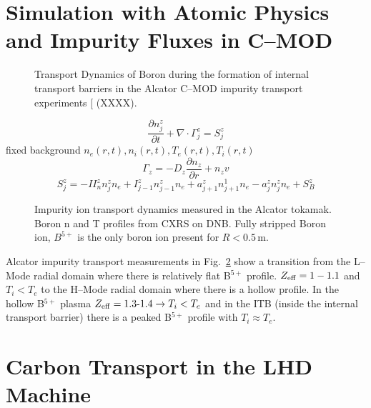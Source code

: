\documentclass[a4paper,openany,12pt]{book}
\begin{document}
\section{Simulation with Atomic Physics and Impurity Fluxes in C--MOD}
%
\begin{figure}[H]
\centerline{}
\caption{Transport Dynamics of Boron during the formation of internal transport barriers in the Alcator C--MOD impurity transport experiments [\emph{} (XXXX).}
\label{F9.23}
\end{figure}
%
$$\frac{\partial n_j^z}{\partial t}+\nabla\cdot\Gamma_j^z=S_j^z$$
fixed background $n_e(r, t), n_i(r, t), T_e(r, t), T_i(r, t)$
$$\Gamma_z=-D_z\frac{\partial n_z}{\partial r}+n_zv$$
$$S_j^z=-II_n^zn_j^zn_e+I_{j-1}^zn_{j-1}^zn_e+a_{j+1}^zn_{j+1}^1n_e-a_j^zn_j^zn_e+S_B^z$$
%
\begin{figure}[htb]
\centerline{}
\caption{Impurity ion transport dynamics measured in the Alcator tokamak. Boron n and T profiles from CXRS on DNB. Fully stripped Boron ion, $B^{5+}$ is the only boron ion present for $R<0.5\,$m.}
\label{F9.24}
\end{figure}
%

Alcator impurity transport measurements in Fig.~\ref{F9.24} show a transition from the L--Mode radial domain where there is relatively flat B$^{5+}$ profile. $Z_{\rm eff}=1-1.1$ and $T_i<T_e$ to the H--Mode radial domain where there is a hollow profile. In the hollow  B$^{5+}$ plasma $Z_{\rm eff}=\mbox{1.3-1.4}\rightarrow T_i<T_e$ and in the ITB (inside the internal transport barrier) there is a peaked B$^{5+}$ profile with $T_i\approx T_e$.

\section{Carbon Transport in the LHD Machine}
\end{document}
